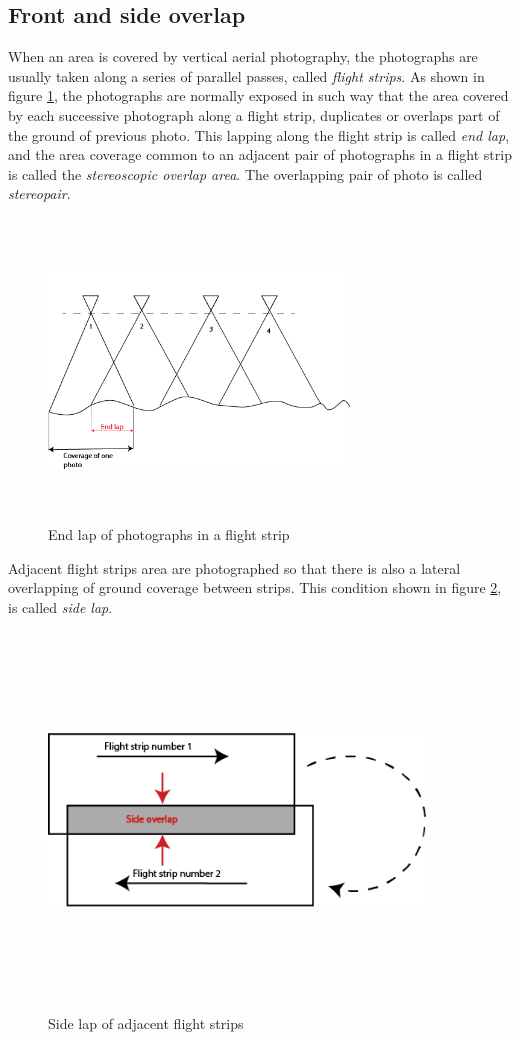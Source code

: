 \subsection{Front and side overlap}
When an area is covered by vertical aerial photography, the photographs are usually taken along a series of parallel passes, called \textit{flight strips}. As shown in figure \ref{fig:EndLap}, the photographs are normally exposed in such way that the area covered by each successive photograph along a flight strip, duplicates or overlaps part of the ground of previous photo. This lapping along the flight strip is called \textit{end lap}, and the area coverage common to an adjacent pair of photographs in a flight strip is called the \textit{stereoscopic overlap area}. The overlapping pair of photo is called \textit{stereopair}.\cite{elements_photogrammetry} \cite{Sergio}
\begin{figure}[H]
\centering
\includegraphics[width=8cm,height=8cm,keepaspectratio]{imagenes/End_Lap.png}
\caption{End lap of photographs in a flight strip}
\label{fig:EndLap}
\end{figure}
Adjacent flight strips area  are photographed so that there is also a lateral overlapping of ground coverage between strips. This condition shown in figure \ref{fig:SideLap}, is called \textit{side lap}\cite{elements_photogrammetry}.
\begin{figure}[H]
\centering
\includegraphics[width=10cm,height=10cm,keepaspectratio]{imagenes/Side_overlap.png}
\caption{Side lap of adjacent flight strips}
\label{fig:SideLap}
\end{figure}

